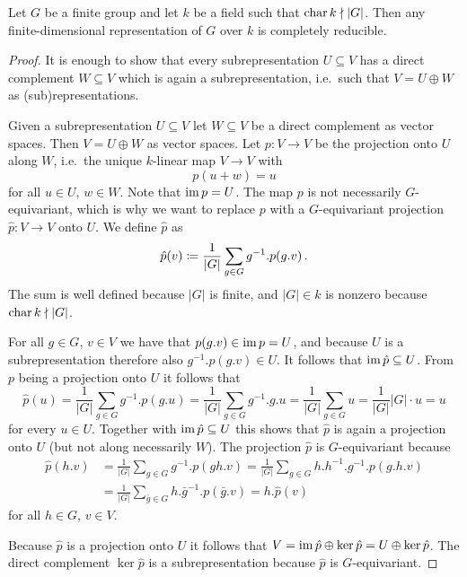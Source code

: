 \begin{theorem}
  Let $G$ be a finite group and let $k$ be a field such that $\operatorname{char} k \nmid |G|$.
  Then any finite-dimensional representation of $G$ over $k$ is completely reducible.
\end{theorem}
\begin{proof}
  It is enough to show that every subrepresentation $U \subseteq V$ has a direct complement $W \subseteq V$ which is again a subrepresentation, i.e.\ such that $V = U \oplus W$ as (sub)representations.
  
  Given a subrepresentation $U \subseteq V$ let $W \subseteq V$ be a direct complement as vector spaces.
  Then $V = U \oplus W$ as vector spaces.
  Let $p \colon V \to V$ be the projection onto $U$ along $W$, i.e.\ the unique $k$-linear map $V \to V$ with
  \[
      p(u + w)
    = u
  \]
  for all $u \in U$, $w \in W$.
  Note that $\operatorname{im} p = U$.
  The map $p$ is not necessarily $G$-equivariant, which is why we want to replace $p$ with a $G$-equivariant projection $\hat{p} \colon V \to V$ onto $U$.
  We define $\hat{p}$ as
  \[
              \hat{p}(v)
    \coloneqq  \frac{1}{|G|} \sum_{g \in G} g^{-1}.p(g.v) \,.
  \]
  The sum is well defined because $|G|$ is finite, and $|G| \in k$ is nonzero because $\operatorname{char} k \nmid |G|$.
  
  For all $g \in G$, $v \in V$ we have that $p(g.v) \in \operatorname{im} p = U$, and because $U$ is a subrepresentation therefore also $g^{-1}.p(g.v) \in U$.
  It follows that $\operatorname{im} \hat{p} \subseteq U$.
  From $p$ being a projection onto $U$ it follows that
  \[
      \hat{p}(u)
    = \frac{1}{|G|} \sum_{g \in G} g^{-1}.p(g.u)
    = \frac{1}{|G|} \sum_{g \in G} g^{-1}.g.u
    = \frac{1}{|G|} \sum_{g \in G} u
    = \frac{1}{|G|} |G| \cdot u
    = u
  \]
  for every $u \in U$.
  Together with $\operatorname{im} \hat{p} \subseteq U$ this shows that $\hat{p}$ is again a projection onto $U$ (but not along necessarily $W$).
  The projection $\hat{p}$ is $G$-equivariant because 
  \begin{align*}
        \hat{p}(h.v)
    &=  \frac{1}{|G|} \sum_{g \in G} g^{-1}.p(gh.v)
     =  \frac{1}{|G|} \sum_{g \in G} h.h^{-1}.g^{-1}.p(g.h.v) \\
    &=  \frac{1}{|G|} \sum_{\bar{g} \in G} h.\bar{g}^{-1}.p(\bar{g}.v)
     =  h.\hat{p}(v)
  \end{align*}
  for all $h \in G$, $v \in V$.
  
  Because $\hat{p}$ is a projection onto $U$ it follows that $V = \operatorname{im} \hat{p} \oplus \ker \hat{p} = U \oplus \ker \hat{p}$.
  The direct complement $\ker \hat{p}$ is a subrepresentation because $\hat{p}$ is $G$-equivariant.
\end{proof}


